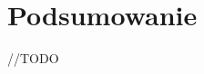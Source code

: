 \documentclass[
    left=2.5cm,         %
    right=2.5cm,        %
    top=2.5cm,          %
    bottom=3cm,         %
    bindingoffset=6mm,  %
    nohyphenation=false %
]{eiti/eiti-thesis}
\begin{document}
\section{Podsumowanie}          %
//TODO

\cleardoublepage %
\printbibliography

\newpage
\pagestyle{plain}


\listoffigures              %
\vspace{1cm}                %
\listoftables               %



\end{document}
